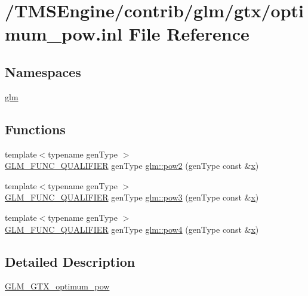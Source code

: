 \hypertarget{optimum__pow_8inl}{}\section{/\+T\+M\+S\+Engine/contrib/glm/gtx/optimum\+\_\+pow.inl File Reference}
\label{optimum__pow_8inl}
\subsection*{Namespaces}
\begin{DoxyCompactItemize}
\item 
 \hyperlink{namespaceglm}{glm}
\end{DoxyCompactItemize}
\subsection*{Functions}
\begin{DoxyCompactItemize}
\item 
{\footnotesize template$<$typename gen\+Type $>$ }\\\hyperlink{setup_8hpp_a33fdea6f91c5f834105f7415e2a64407}{G\+L\+M\+\_\+\+F\+U\+N\+C\+\_\+\+Q\+U\+A\+L\+I\+F\+I\+ER} gen\+Type \hyperlink{group__gtx__optimum__pow_ga19aaff3213bf23bdec3ef124ace237e9}{glm\+::pow2} (gen\+Type const \&\hyperlink{_s_d_l__opengl_8h_ad0e63d0edcdbd3d79554076bf309fd47}{x})
\item 
{\footnotesize template$<$typename gen\+Type $>$ }\\\hyperlink{setup_8hpp_a33fdea6f91c5f834105f7415e2a64407}{G\+L\+M\+\_\+\+F\+U\+N\+C\+\_\+\+Q\+U\+A\+L\+I\+F\+I\+ER} gen\+Type \hyperlink{group__gtx__optimum__pow_ga35689d03cd434d6ea819f1942d3bf82e}{glm\+::pow3} (gen\+Type const \&\hyperlink{_s_d_l__opengl_8h_ad0e63d0edcdbd3d79554076bf309fd47}{x})
\item 
{\footnotesize template$<$typename gen\+Type $>$ }\\\hyperlink{setup_8hpp_a33fdea6f91c5f834105f7415e2a64407}{G\+L\+M\+\_\+\+F\+U\+N\+C\+\_\+\+Q\+U\+A\+L\+I\+F\+I\+ER} gen\+Type \hyperlink{group__gtx__optimum__pow_gacef0968763026e180e53e735007dbf5a}{glm\+::pow4} (gen\+Type const \&\hyperlink{_s_d_l__opengl_8h_ad0e63d0edcdbd3d79554076bf309fd47}{x})
\end{DoxyCompactItemize}


\subsection{Detailed Description}
\hyperlink{group__gtx__optimum__pow}{G\+L\+M\+\_\+\+G\+T\+X\+\_\+optimum\+\_\+pow} 
